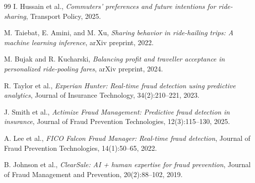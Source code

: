 \begin{thebibliography}{99}
I. Hussain et al.,
\textit{Commuters’ preferences and future intentions for ride-sharing},
Transport Policy, 2025.

M. Taiebat, E. Amini, and M. Xu,
\textit{Sharing behavior in ride-hailing trips: A machine learning inference},
arXiv preprint, 2022.

M. Bujak and R. Kucharski,
\textit{Balancing profit and traveller acceptance in personalized ride-pooling fares},
arXiv preprint, 2024.

R. Taylor et al.,
\textit{Experian Hunter: Real-time fraud detection using predictive analytics},
Journal of Insurance Technology, 34(2):210–221, 2023.

J. Smith et al.,
\textit{Actimize Fraud Management: Predictive fraud detection in insurance},
Journal of Fraud Prevention Technologies, 12(3):115–130, 2025.

A. Lee et al.,
\textit{FICO Falcon Fraud Manager: Real-time fraud detection},
Journal of Fraud Prevention Technologies, 14(1):50–65, 2022.

B. Johnson et al.,
\textit{ClearSale: AI + human expertise for fraud prevention},
Journal of Fraud Management and Prevention, 20(2):88–102, 2019.

\end{thebibliography}


